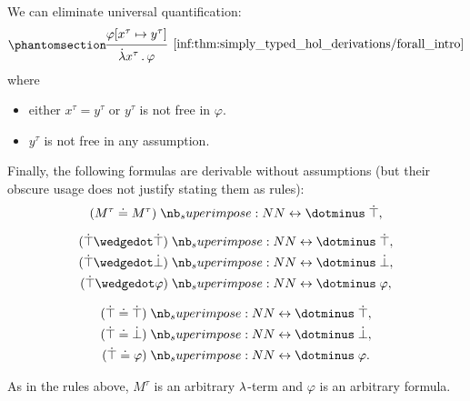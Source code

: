 \begin{proposition}
\begin{thmenum}[series=thm:simply_typed_hol_derivations]
     We can eliminate universal quantification:
    \begin{equation*}\taglabel[\ensuremath{ \logic{HOL}_{\forall+} }]{inf:thm:simply_typed_hol_derivations/forall_intro}
      \begin{prooftree}
        \hypo{ \varphi[x^\tau \mapsto y^\tau] }
        \infer1[\ref{inf:thm:simply_typed_hol_derivations/forall_intro}]{ \qabs {x^\tau} \varphi },
      \end{prooftree}
    \end{equation*}
    where
    \begin{itemize}
      \item either \( x^\tau = y^\tau \) or \( y^\tau \) is not free in \( \varphi \).
      \item \( y^\tau \) is not free in any assumption.
    \end{itemize}
  \end{thmenum}

  Finally, the following formulas are derivable without assumptions (but their obscure usage does not justify stating them as rules):
  \begin{equation}\label{eq:thm:simply_typed_hol_derivations/refl_iff_top}
    (M^\tau \syneq M^\tau) \syniff \syntop,
  \end{equation}

  \begin{paracol}{2}
    \begin{leftcolumn}
      \begin{align}
        (\syntop \synwedge \syntop) &\syniff \syntop, \label{eq:thm:simply_typed_hol_derivations/top_and_top} \\
        (\syntop \synwedge \synbot) &\syniff \synbot, \label{eq:thm:simply_typed_hol_derivations/top_and_bot} \\
        (\syntop \synwedge \varphi) &\syniff \varphi, \label{eq:thm:simply_typed_hol_derivations/top_and_phi}
      \end{align}
    \end{leftcolumn}

    \begin{rightcolumn}
      \begin{align}
        (\syntop \syneq \syntop)    &\syniff \syntop, \label{eq:thm:simply_typed_hol_derivations/top_eq_top} \\
        (\syntop \syneq \synbot)    &\syniff \synbot, \label{eq:thm:simply_typed_hol_derivations/top_eq_bot} \\
        (\syntop \syneq \varphi)    &\syniff \varphi. \label{eq:thm:simply_typed_hol_derivations/top_eq_phi}
      \end{align}
    \end{rightcolumn}
  \end{paracol}

  As in the rules above, \( M^\tau \) is an arbitrary \( {\mathrm \lambda} \)-term and \( \varphi \) is an arbitrary formula.
\end{proposition}
